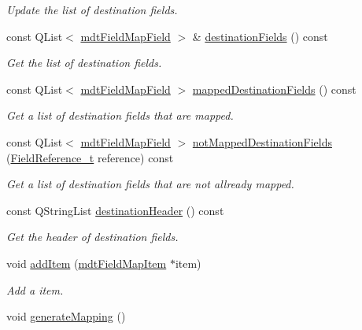 \begin{DoxyCompactItemize}
\begin{DoxyCompactList}\small\item\em Update the list of destination fields. \end{DoxyCompactList}\item 
const Q\-List$<$ \hyperlink{classmdt_field_map_field}{mdt\-Field\-Map\-Field} $>$ \& \hyperlink{classmdt_field_map_ad1bd0470eb318308d23a9a687a1c4517}{destination\-Fields} () const 
\begin{DoxyCompactList}\small\item\em Get the list of destination fields. \end{DoxyCompactList}\item 
const Q\-List$<$ \hyperlink{classmdt_field_map_field}{mdt\-Field\-Map\-Field} $>$ \hyperlink{classmdt_field_map_a08704f082e3fe407a2e395c98a5eec60}{mapped\-Destination\-Fields} () const 
\begin{DoxyCompactList}\small\item\em Get a list of destination fields that are mapped. \end{DoxyCompactList}\item 
const Q\-List$<$ \hyperlink{classmdt_field_map_field}{mdt\-Field\-Map\-Field} $>$ \hyperlink{classmdt_field_map_a3b618d50c5c7cb8c1086dba5db18d7a7}{not\-Mapped\-Destination\-Fields} (\hyperlink{classmdt_field_map_a8a8dd62273d396d926bf3df837407392}{Field\-Reference\-\_\-t} reference) const 
\begin{DoxyCompactList}\small\item\em Get a list of destination fields that are not allready mapped. \end{DoxyCompactList}\item 
const Q\-String\-List \hyperlink{classmdt_field_map_a1b5a0b01a2583173328362b3f86cec3d}{destination\-Header} () const 
\begin{DoxyCompactList}\small\item\em Get the header of destination fields. \end{DoxyCompactList}\item 
void \hyperlink{classmdt_field_map_a6914818142ea30f7bce6a012be9fb69f}{add\-Item} (\hyperlink{classmdt_field_map_item}{mdt\-Field\-Map\-Item} $\ast$item)
\begin{DoxyCompactList}\small\item\em Add a item. \end{DoxyCompactList}\item 
void \hyperlink{classmdt_field_map_ae994e83a8aa622b2c0a5c5ea035c1d04}{generate\-Mapping} ()

\end{DoxyCompactItemize}
